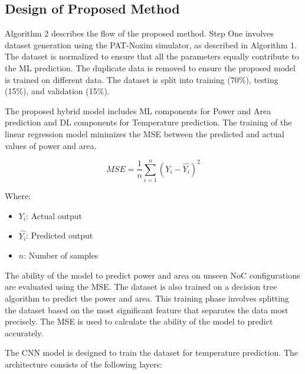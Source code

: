 \documentclass[conference]{IEEEtran}
\begin{document}
\subsection{Design of Proposed Method}
Algorithm 2 describes the flow of the proposed method. Step One involves dataset generation using the PAT-Noxim simulator, as described in Algorithm 1. The dataset is normalized to ensure that all the parameters equally contribute to the ML prediction. The duplicate data is removed to ensure the proposed model is trained on different data. The dataset is split into training (70\%), testing (15\%), and validation (15\%).

The proposed hybrid model includes ML components for Power and Area prediction and DL components for Temperature prediction. The training of the linear regression model minimizes the MSE between the predicted and actual values of power and area. 

\[
MSE = \frac{1}{n} \sum_{i=1}^{n} \left( Y_i - \hat{Y_i} \right)^2
\]

Where:
\begin{itemize}
    \item \( Y_i \): Actual output
    \item \( \hat{Y_i} \): Predicted output
    \item \( n \): Number of samples
\end{itemize}
The ability of the model to predict power and area on unseen NoC configurations are evaluated using the MSE.
The dataset is also trained on a decision tree algorithm to predict the power and area. This training phase involves splitting the dataset based on the most significant feature that separates the data most precisely. The MSE is used to calculate the ability of the model to predict accurately. 

The CNN model is designed to train the dataset for temperature prediction. The architecture consists of the following layers:
\end{document}
